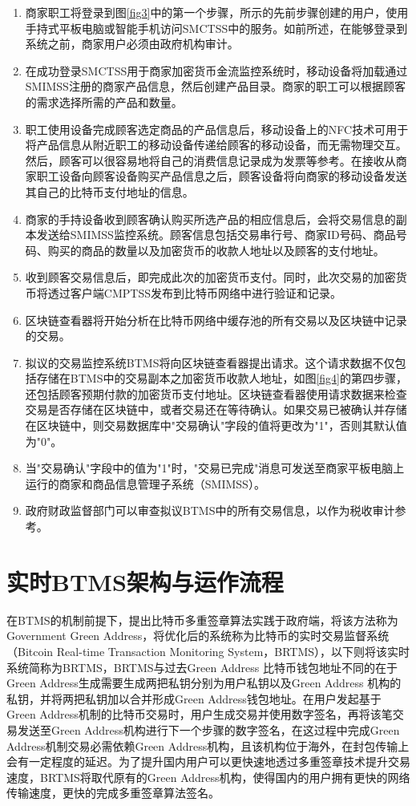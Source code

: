 		\begin{enumerate}
			\item 商家职工将登录到图\ref{fig3}中的第一个步骤，所示的先前步骤创建的用户，使用手持式平板电脑或智能手机访问SMCTSS中的服务。如前所述，在能够登录到系统之前，商家用户必须由政府机构审计。
			\item 在成功登录SMCTSS用于商家加密货币金流监控系统时，移动设备将加载通过SMIMSS注册的商家产品信息，然后创建产品目录。商家的职工可以根据顾客的需求选择所需的产品和数量。

			\item 职工使用设备完成顾客选定商品的产品信息后，移动设备上的NFC技术可用于将产品信息从附近职工的移动设备传递给顾客的移动设备，而无需物理交互。然后，顾客可以很容易地将自己的消费信息记录成为发票等参考。在接收从商家职工设备向顾客设备购买产品信息之后，顾客设备将向商家的移动设备发送其自己的比特币支付地址的信息。
			\item 商家的手持设备收到顾客确认购买所选产品的相应信息后，会将交易信息的副本发送给SMIMSS监控系统。顾客信息包括交易串行号、商家ID号码、商品号码、购买的商品的数量以及加密货币的收款人地址以及顾客的支付地址。
			\item 收到顾客交易信息后，即完成此次的加密货币支付。同时，此次交易的加密货币将透过客户端CMPTSS发布到比特币网络中进行验证和记录。
			\item 区块链查看器将开始分析在比特币网络中缓存池的所有交易以及区块链中记录的交易。
			\item 拟议的交易监控系统BTMS将向区块链查看器提出请求。这个请求数据不仅包括存储在BTMS中的交易副本之加密货币收款人地址，如图\ref{fig4}的第四步骤，还包括顾客预期付款的加密货币支付地址。区块链查看器使用请求数据来检查交易是否存储在区块链中，或者交易还在等待确认。如果交易已被确认并存储在区块链中，则交易数据库中"交易确认"字段的值将更改为"1"，否则其默认值为"0"。
			\item 当"交易确认"字段中的值为"1"时，"交易已完成"消息可发送至商家平板电脑上运行的商家和商品信息管理子系统（SMIMSS）。
			\item 政府财政监督部门可以审查拟议BTMS中的所有交易信息，以作为税收审计参考。
		\end{enumerate}

\section{实时BTMS架构与运作流程}

		在BTMS的机制前提下，提出比特币多重签章算法实践于政府端，将该方法称为Government Green Address，将优化后的系统称为比特币的实时交易监督系统（Bitcoin Real-time Transaction Monitoring System，BRTMS）\supercite{tanet}，以下则将该实时系统简称为BRTMS，BRTMS与过去Green Address 比特币钱包地址不同的在于Green Address生成需要生成两把私钥分别为用户私钥以及Green Address 机构的私钥，并将两把私钥加以合并形成Green Address钱包地址。在用户发起基于Green Address机制的比特币交易时，用户生成交易并使用数字签名，再将该笔交易发送至Green Address机构进行下一个步骤的数字签名，在这过程中完成Green Address机制交易必需依赖Green Address机构，且该机构位于海外，在封包传输上会有一定程度的延迟。为了提升国内用户可以更快速地透过多重签章技术提升交易速度，BRTMS将取代原有的Green Address机构，使得国内的用户拥有更快的网络传输速度，更快的完成多重签章算法签名。 

